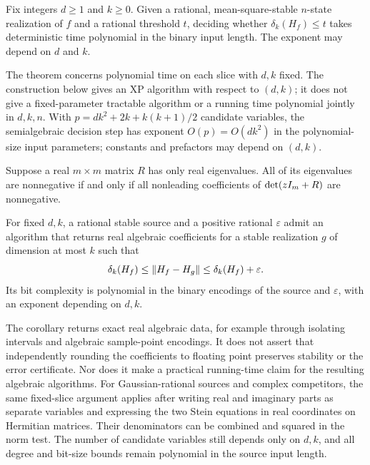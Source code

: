 \begin{theorem}\label{I:U:thm:fixed}
Fix integers $d\ge1$ and $k\ge0$.  Given a rational, mean-square-stable
$n$-state realization of $f$ and a rational threshold $t$, deciding whether
$\delta_k(H_f)\le t$ takes deterministic time polynomial in the binary
input length.  The exponent may depend on $d$ and $k$.
\end{theorem}

The theorem concerns polynomial time on each slice with $d,k$ fixed.
The construction below gives an XP algorithm with respect to $(d,k)$;
it does not give a fixed-parameter tractable algorithm or a running time
polynomial jointly in $d,k,n$. With $p=dk^2+2k+k(k+1)/2$ candidate variables, the semialgebraic decision step has exponent $O(p)=O(dk^2)$ in the polynomial-size input parameters; constants and prefactors may depend on $(d,k)$.

\begin{lemma}\label{I:U:lem:coefftest}
Suppose a real $m\times m$ matrix $R$ has only real eigenvalues.
All of its eigenvalues are nonnegative if and only if all nonleading
coefficients of $\det(zI_m+R)$ are nonnegative.
\end{lemma}




\begin{corollary}\label{I:U:cor:fixed-synthesis}
For fixed $d,k$, a rational stable source and a positive rational
$\varepsilon$ admit an algorithm that returns real algebraic
coefficients for a stable realization $g$ of dimension at most $k$
such that
\[
 \delta_k(H_f)\le\left\lVert H_f-H_g\right\rVert
 \le\delta_k(H_f)+\varepsilon.
\]
Its bit complexity is polynomial in the binary encodings of the
source and $\varepsilon$, with an exponent depending on $d,k$.
\end{corollary}


\begin{remark}
The corollary returns exact real algebraic data, for example through
isolating intervals and algebraic sample-point encodings.  It does not
assert that independently rounding the coefficients to floating point
preserves stability or the error certificate.  Nor does it make a
practical running-time claim for the resulting algebraic algorithms.
For Gaussian-rational sources and complex competitors, the same
fixed-slice argument applies after writing real and imaginary parts
as separate variables and expressing the two Stein equations in real
coordinates on Hermitian matrices.  Their denominators can be
combined and squared in the norm test.  The number of candidate
variables still depends only on $d,k$, and all degree and bit-size
bounds remain polynomial in the source input length.
\end{remark}


